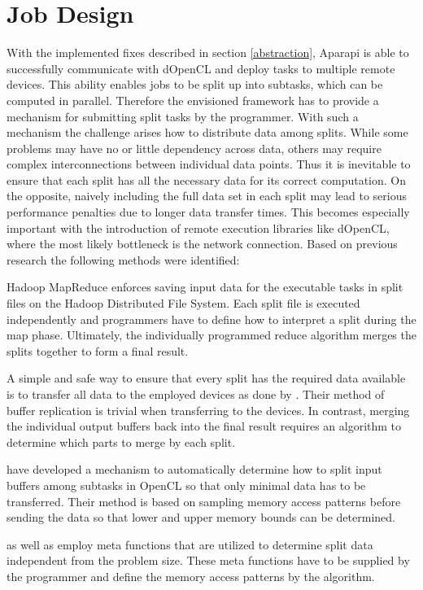 \section{Job Design}
\label{job_design}
With the implemented fixes described in section \ref{abstraction}, Aparapi is able to successfully communicate with dOpenCL and deploy tasks to multiple remote devices. This ability enables jobs to be split up into subtasks, which can be computed in parallel. Therefore the envisioned framework has to provide a mechanism for submitting split tasks by the programmer. With such a mechanism the challenge arises how to distribute data among splits. While some problems may have no or little dependency across data, others may require complex interconnections between individual data points. Thus it is inevitable to ensure that each split has all the necessary data for its correct computation. On the opposite, naively including the full data set in each split may lead to serious performance penalties due to longer data transfer times. This becomes especially important with the introduction of remote execution libraries like dOpenCL, where the most likely bottleneck is the network connection. Based on previous research the following methods were identified:

\begin{description}[style=nextline]
	\item [Manual Splits]
	Hadoop MapReduce enforces saving input data for the executable tasks in split files on the Hadoop Distributed File System. Each split file is executed independently and programmers have to define how to interpret a split during the map phase. Ultimately, the individually programmed reduce algorithm merges the splits together to form a final result.

	\item [Naive Buffer Replication]
	A simple and safe way to ensure that every split has the required data available is to transfer all data to the employed devices as done by \citeauthor{delalama_2012}\cite{delalama_2012}. Their method of buffer replication is trivial when transferring to the devices. In contrast, merging the individual output buffers back into the final result requires an algorithm to determine which parts to merge by each split.

	\item [Intelligent Buffer Replication]
	\citeauthor{Kim_2011}\cite{Kim_2011} have developed a mechanism to automatically determine how to split input buffers among subtasks in OpenCL so that only minimal data has to be transferred. Their method is based on sampling memory access patterns before sending the data so that lower and upper memory bounds can be determined.

	\item [Meta Functions]
	\citeauthor{stepocl}\cite{stepocl} as well as \citeauthor{distcl}\cite{distcl} employ meta functions that are utilized to determine split data independent from the problem size. These meta functions have to be supplied by the programmer and define the memory access patterns by the algorithm.

\end{description}

